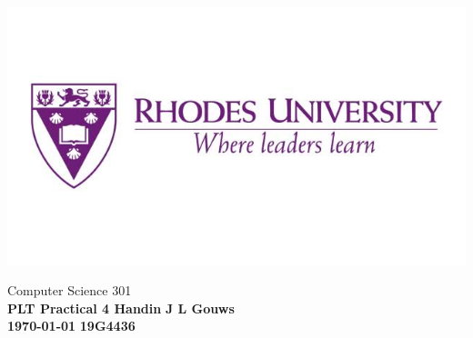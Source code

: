 \documentclass[a4paper,12pt]{article}
\newcommand\block[1]{\hspace*{#1}}
\begin{document}
\selectfont
\thispagestyle{empty}

\begin{minipage}{0.25\dimexpr\textwidth}
  \includegraphics[scale = 0.2]{RhodesLogo.jpg} 
\end{minipage}
\hfill {Computer Science 301}\\

{\Large \textbf{PLT Practical 4 Handin}} \hfill {\Large \textbf{J L Gouws}}\\
\block{1.0cm} {\large \textbf{\today}} \hfill {\large \textbf{19G4436}}\\
\end{document}
